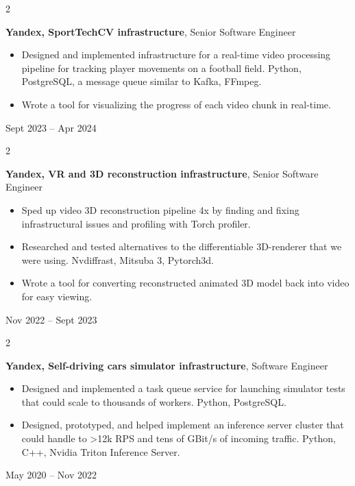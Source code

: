 \documentclass[11pt, letterpaper]{article}
\newenvironment{highlights}{
    \begin{itemize}[
        topsep=0.10 cm,
        parsep=0.10 cm,
        partopsep=0pt,
        itemsep=0pt,
        leftmargin=0.4 cm + 10pt
    ]
}{
    \end{itemize}
} %
\newenvironment{twocolentry}[2][]{
    \onecolentry
    \def\secondColumn{#2}
    \setcolumnwidth{\fill, 4.5 cm}
    \begin{paracol}{2}
}{
    \switchcolumn \raggedleft \secondColumn
    \end{paracol}
    \endonecolentry
} %
\begin{document}
        \vspace{0.2 cm}

        \begin{twocolentry}{
            Sept 2023 – Apr 2024
        }
            \textbf{Yandex, SportTechCV infrastructure}, Senior Software Engineer
            \begin{highlights}
                \item Designed and implemented infrastructure for a real-time video processing pipeline for tracking player movements on a football field. Python, PostgreSQL, a message queue similar to Kafka, FFmpeg.
                \item Wrote a tool for visualizing the progress of each video chunk in real-time.
            \end{highlights}
        \end{twocolentry}


        \vspace{0.2 cm}

        \begin{twocolentry}{
            Nov 2022 – Sept 2023
        }
            \textbf{Yandex, VR and 3D reconstruction infrastructure}, Senior Software Engineer
            \begin{highlights}
                \item Sped up video 3D reconstruction pipeline 4x by finding and fixing infrastructural issues and profiling with Torch profiler.
                \item Researched and tested alternatives to the differentiable 3D-renderer that we were using. Nvdiffrast, Mitsuba 3, Pytorch3d.
                \item Wrote a tool for converting reconstructed animated 3D model back into video for easy viewing.
            \end{highlights}
        \end{twocolentry}


        \vspace{0.2 cm}

        \begin{twocolentry}{
            May 2020 – Nov 2022
        }
            \textbf{Yandex, Self-driving cars simulator infrastructure}, Software Engineer
            \begin{highlights}
                \item Designed and implemented a task queue service for launching simulator tests that could scale to thousands of workers. Python, PostgreSQL.
                \item Designed, prototyped, and helped implement an inference server cluster that could handle to >12k RPS and tens of GBit/s of incoming traffic. Python, C++, Nvidia Triton Inference Server.
            \end{highlights}
        \end{twocolentry}
\end{document}
